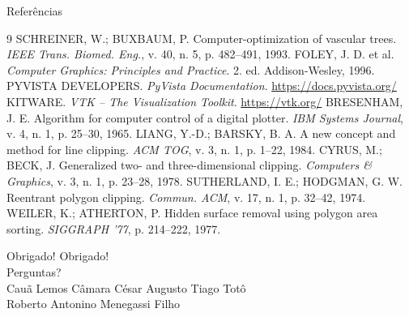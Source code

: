 \documentclass[aspectratio=169,11pt]{beamer}
\begin{document}
\begin{frame}[allowframebreaks]{Referências}
\scriptsize
\begin{thebibliography}{9}
 SCHREINER, W.; BUXBAUM, P. Computer-optimization of vascular trees. \textit{IEEE Trans. Biomed. Eng.}, v. 40, n. 5, p. 482--491, 1993.
 FOLEY, J. D. et al. \textit{Computer Graphics: Principles and Practice}. 2. ed. Addison-Wesley, 1996.
 PYVISTA DEVELOPERS. \textit{PyVista Documentation}. \url{https://docs.pyvista.org/}
 KITWARE. \textit{VTK -- The Visualization Toolkit}. \url{https://vtk.org/}
 BRESENHAM, J. E. Algorithm for computer control of a digital plotter. \textit{IBM Systems Journal}, v. 4, n. 1, p. 25--30, 1965.
 LIANG, Y.-D.; BARSKY, B. A. A new concept and method for line clipping. \textit{ACM TOG}, v. 3, n. 1, p. 1--22, 1984.
 CYRUS, M.; BECK, J. Generalized two- and three-dimensional clipping. \textit{Computers \& Graphics}, v. 3, n. 1, p. 23--28, 1978.
 SUTHERLAND, I. E.; HODGMAN, G. W. Reentrant polygon clipping. \textit{Commun. ACM}, v. 17, n. 1, p. 32--42, 1974.
 WEILER, K.; ATHERTON, P. Hidden surface removal using polygon area sorting. \textit{SIGGRAPH '77}, p. 214--222, 1977.
\end{thebibliography}
\end{frame}

\begin{frame}{Obrigado!}
\centering
{\Huge Obrigado!}\\[0.45cm]
{\large Perguntas?}\\[0.4cm]
{\small Cauã Lemos Câmara \quad César Augusto Tiago Totô\\
Roberto Antonino Menegassi Filho}
\end{frame}
\end{document}
